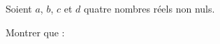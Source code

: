 \begin{exo}{}
	Soient $a$, $b$, $c$ et $d$ quatre nombres réels non nuls.

	Montrer que : 
\end{exo}
